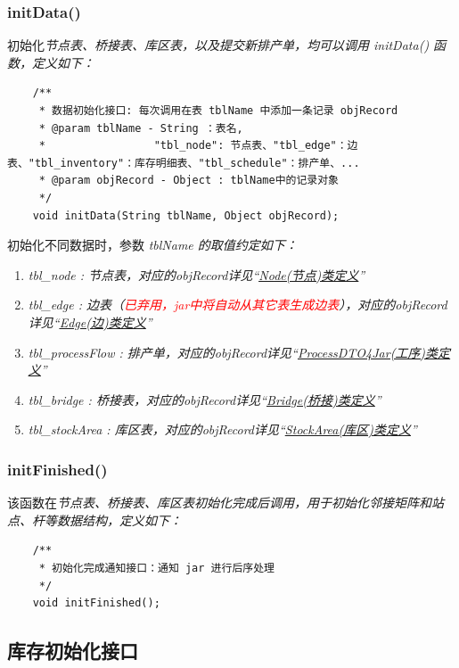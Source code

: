 \subsubsection{initData()}
初始化\it{节点表}、\it{桥接表}、\it{库区表}，以及提交\it{新排产单}，均可以调用 initData() 函数，定义如下：
\begin{lstlisting}
    /**
     * 数据初始化接口: 每次调用在表 tblName 中添加一条记录 objRecord
     * @param tblName - String ：表名,
     *                 "tbl_node": 节点表、"tbl_edge"：边表、"tbl_inventory"：库存明细表、"tbl_schedule"：排产单、...
     * @param objRecord - Object : tblName中的记录对象
     */
    void initData(String tblName, Object objRecord);
\end{lstlisting}\vspace{-30pt}
初始化不同数据时，参数 \it{tblName} 的取值约定如下：
\begin{enumerate}
    \item \it{tbl\_node} : 节点表，对应的objRecord详见“\hyperref[sec:param-node]{\underline{Node(节点)类定义}}”
    \item \it{tbl\_edge} : 边表（\textcolor{red}{已弃用，jar中将自动从其它表生成边表}），对应的objRecord详见“\hyperref[sec:param-edge]{\underline{Edge(边)类定义}}”
    \item \it{tbl\_processFlow} : 排产单，对应的objRecord详见“\hyperref[sec:param-process]{\underline{ProcessDTO4Jar(工序)类定义}}”
    \item \it{tbl\_bridge} : 桥接表，对应的objRecord详见“\hyperref[sec:param-bridge]{\underline{Bridge(桥接)类定义}}”
    \item \it{tbl\_stockArea} : 库区表，对应的objRecord详见“\hyperref[sec:param-stockArea]{\underline{StockArea(库区)类定义}}”
\end{enumerate}
\subsubsection{initFinished()}
该函数在\it{节点表}、\it{桥接表}、\it{库区表}初始化完成后调用，用于初始化\it{邻接矩阵}和\it{站点、杆}等数据结构，定义如下：
\begin{lstlisting}
    /**
     * 初始化完成通知接口：通知 jar 进行后序处理
     */
    void initFinished();
\end{lstlisting}\vspace{-30pt}
\subsection{库存初始化接口}
